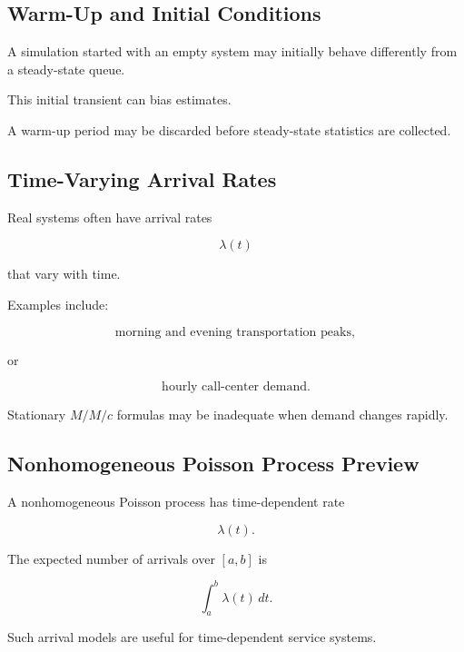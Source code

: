 \subsection{Warm-Up and Initial Conditions}
\label{subsec:queue-simulation-warmup}

A simulation started with an empty system may initially behave differently
from a steady-state queue.

This initial transient can bias estimates.

A warm-up period may be discarded before steady-state statistics are
collected.

\subsection{Time-Varying Arrival Rates}
\label{subsec:time-varying-arrival-rates}

Real systems often have arrival rates

\[
\boxed{
\lambda(t)
}
\]

that vary with time.

Examples include:

\[
\boxed{
\text{morning and evening transportation peaks},
}
\]

or

\[
\boxed{
\text{hourly call-center demand}.
}
\]

Stationary \(M/M/c\) formulas may be inadequate when demand changes
rapidly.

\subsection{Nonhomogeneous Poisson Process Preview}
\label{subsec:nonhomogeneous-poisson-queue}

A nonhomogeneous Poisson process has time-dependent rate

\[
\lambda(t).
\]

The expected number of arrivals over \([a,b]\) is

\[
\boxed{
\int_a^b
\lambda(t)\,dt.
}
\]

Such arrival models are useful for time-dependent service systems.

